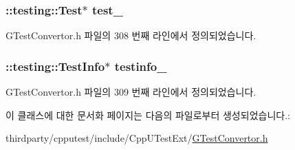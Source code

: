 \subsubsection[{\texorpdfstring{test\+\_\+}{test_}}]{\setlength{\rightskip}{0pt plus 5cm}\+::testing\+::\+Test$\ast$ test\+\_\+\hspace{0.3cm}{\ttfamily [private]}}\hypertarget{class_g_test_u_test_a340ce8083add9c68ded290a1acd6468f}{}\label{class_g_test_u_test_a340ce8083add9c68ded290a1acd6468f}


G\+Test\+Convertor.\+h 파일의 308 번째 라인에서 정의되었습니다.

\subsubsection[{\texorpdfstring{testinfo\+\_\+}{testinfo_}}]{\setlength{\rightskip}{0pt plus 5cm}\+::testing\+::\+Test\+Info$\ast$ testinfo\+\_\+\hspace{0.3cm}{\ttfamily [private]}}\hypertarget{class_g_test_u_test_abef922afbd1c3ecb7ad7e9c886f80ec0}{}\label{class_g_test_u_test_abef922afbd1c3ecb7ad7e9c886f80ec0}


G\+Test\+Convertor.\+h 파일의 309 번째 라인에서 정의되었습니다.



이 클래스에 대한 문서화 페이지는 다음의 파일로부터 생성되었습니다.\+:\begin{DoxyCompactItemize}
\item 
thirdparty/cpputest/include/\+Cpp\+U\+Test\+Ext/\hyperlink{_g_test_convertor_8h}{G\+Test\+Convertor.\+h}\end{DoxyCompactItemize}
